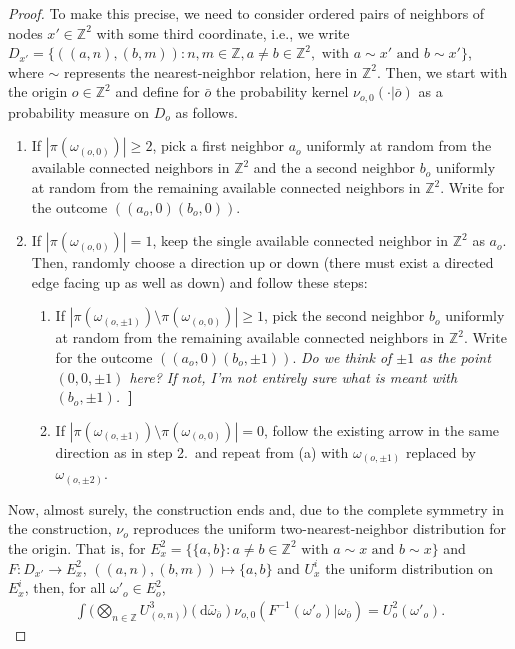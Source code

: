 \documentclass{article}
\theoremstyle{definition}
\newcommand{\1}{\mathbbm{1}}
\newcommand{\0}{\mathbf{o}}
\renewcommand{\d}{\mathrm{d}}
\newcommand{\Z}{\mathbb{Z}}
\newcommand{\basc}[1]{{\color{blue}{ \bf [~Bas:\ }\emph{#1}\textbf{~]}}}
\begin{document}
\begin{proof}
To make this precise, we need to consider ordered pairs of neighbors of nodes $x'\in \Z^2$ with some third coordinate, i.e., we write $D_{x'}=\{((a,n),(b,m))\colon n,m\in \Z, a\neq b\in \Z^2, \text{ with }a\sim x'\text{ and }b\sim x'\}$, where $\sim$ represents the nearest-neighbor relation, here in $\Z^2$. Then, we start with the origin $o\in \Z^2$ and define for $\bar o$ the probability kernel $\nu_{o,0}(\cdot|\bar o)$ as a probability measure on $D_o$ as follows. 
\begin{enumerate}
\item If $|\pi(\omega_{(o,0)})|\ge 2$, pick a first neighbor $a_o$ uniformly at random from the available connected neighbors in $\Z^2$ and the a second neighbor $b_o$ uniformly at random from the remaining available connected neighbors in $\Z^2$. Write for the outcome $((a_o,0)(b_o,0))$.
\item If $|\pi(\omega_{(o,0)})|=1$, 
keep the single available connected neighbor in $\Z^2$ as $a_o$. Then, randomly choose a direction up or down (there must exist a directed edge facing up as well as down) and follow these steps:
\begin{enumerate}
\item If $|\pi(\omega_{(o,\pm 1)})\setminus \pi(\omega_{(o,0)})|\ge 1$, 
pick the second neighbor $b_o$ uniformly at random from the remaining available connected neighbors in $\Z^2$. Write for the outcome $((a_o,0)(b_o,\pm 1))$.
\basc{Do we think of $\pm 1$ as the point $(0,0,\pm 1)$ here? If not, I'm not entirely sure what is meant with $(b_o,\pm 1)$.}
\item If $|\pi(\omega_{(o,\pm 1)})\setminus \pi(\omega_{(o,0)})|= 0$, follow the existing arrow in the same direction as in step 2.~and repeat from (a) with $\omega_{(o,\pm 1)}$ replaced by $\omega_{(o,\pm 2)}$.
\end{enumerate}
\end{enumerate}
Now, almost surely, the construction ends and, due to the complete symmetry in the construction, $\nu_o$ reproduces the uniform two-nearest-neighbor distribution for the origin. That is, for $E^2_x=\{\{a,b\}\colon a\neq b\in \Z^2\text{ with }a\sim x\text{ and }b\sim x\}$ and $F\colon D_{x'}\to E^2_x$, $((a,n),(b,m))\mapsto \{a,b\}$ and $U^i_x$ the uniform distribution on $E^i_x$, then, for all $\omega'_o\in E^2_o$,
\begin{align*}
\int \Big(\bigotimes_{n\in \Z}U^3_{(o,n)}\Big)(\d \bar \omega_{\bar o})\nu_{o,0}(F^{-1}(\omega'_o)|\omega_{\bar o})=U^2_o(\omega'_o).
\end{align*}


\end{proof}
\end{document}
